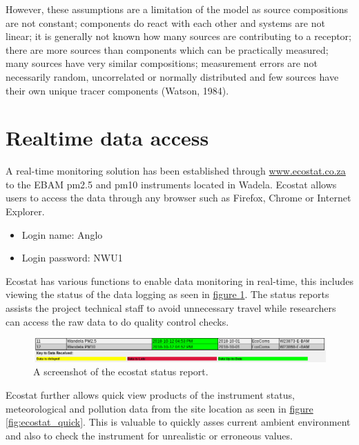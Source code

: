 \documentclass{nwureport}
\begin{document}
However, these assumptions are a limitation of the model as source compositions are not constant;
components do react with each other and systems are not linear; it is generally not known how many
sources are contributing to a receptor; there are more sources than components which can be practically
measured; many sources have very similar compositions; measurement errors are not necessarily random,
uncorrelated or normally distributed and few sources have their own unique tracer components (Watson,
1984).

\section{Realtime data access}

A real-time monitoring solution has been established through \url{www.ecostat.co.za} to
the EBAM \gls{pm2.5} and \gls{pm10} instruments located in Wadela. Ecostat allows users to access the data
through any browser such as Firefox, Chrome or Internet Explorer. 

\begin{itemize}
\item Login name: Anglo
\item Login password: NWU1
\end{itemize}

Ecostat has various functions to enable data monitoring in real-time, this includes
viewing the status of the data logging as seen in \hyperref[fig:ecostat_status]{figure \ref{fig:ecostat_status}}. The status reports assists the project technical staff to avoid
unnecessary travel while researchers can access the raw data to do quality control checks. 

\begin{figure}[!htb]
    \centering
    \includegraphics[width=\textwidth]{images/ecstat_status.png}
    \caption[A screenshot of the ecostat status report.]
    {A screenshot of the ecostat status report.}
    \label{fig:ecostat_status}
\end{figure}

Ecostat further allows quick view products of the instrument status,
meteorological and pollution data from the site location as seen
in \hyperref[fig:ecostat_quick]{figure \ref{fig:ecostat_quick}}. This is
valuable to quickly asses current ambient environment and also to check the
instrument for unrealistic or erroneous values.
\end{document}

